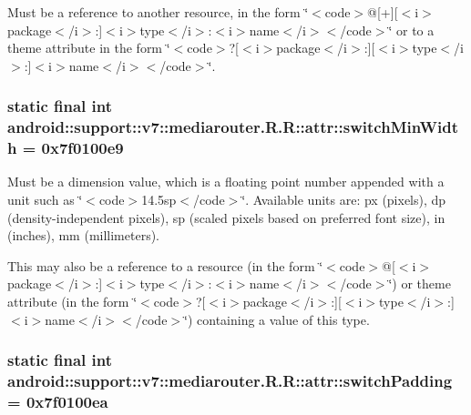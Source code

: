 Must be a reference to another resource, in the form \char`\"{}$<$code$>$@\mbox{[}+\mbox{]}\mbox{[}$<$i$>$package$<$/i$>$:\mbox{]}$<$i$>$type$<$/i$>$:$<$i$>$name$<$/i$>$$<$/code$>$\char`\"{} or to a theme attribute in the form \char`\"{}$<$code$>$?\mbox{[}$<$i$>$package$<$/i$>$:\mbox{]}\mbox{[}$<$i$>$type$<$/i$>$:\mbox{]}$<$i$>$name$<$/i$>$$<$/code$>$\char`\"{}. \hypertarget{classandroid_1_1support_1_1v7_1_1mediarouter_1_1_r_1_1attr_ac6a13f053401d35106724e5b94df1cd}{
\subsubsection[{switchMinWidth}]{\setlength{\rightskip}{0pt plus 5cm}static final int android::support::v7::mediarouter.R.R::attr::switchMinWidth = 0x7f0100e9}}
\label{classandroid_1_1support_1_1v7_1_1mediarouter_1_1_r_1_1attr_ac6a13f053401d35106724e5b94df1cd}


Must be a dimension value, which is a floating point number appended with a unit such as \char`\"{}$<$code$>$14.5sp$<$/code$>$\char`\"{}. Available units are: px (pixels), dp (density-independent pixels), sp (scaled pixels based on preferred font size), in (inches), mm (millimeters). 

This may also be a reference to a resource (in the form \char`\"{}$<$code$>$@\mbox{[}$<$i$>$package$<$/i$>$:\mbox{]}$<$i$>$type$<$/i$>$:$<$i$>$name$<$/i$>$$<$/code$>$\char`\"{}) or theme attribute (in the form \char`\"{}$<$code$>$?\mbox{[}$<$i$>$package$<$/i$>$:\mbox{]}\mbox{[}$<$i$>$type$<$/i$>$:\mbox{]}$<$i$>$name$<$/i$>$$<$/code$>$\char`\"{}) containing a value of this type. \hypertarget{classandroid_1_1support_1_1v7_1_1mediarouter_1_1_r_1_1attr_198a9e3fe43c19c7eaffa220525ec3cd}{
\subsubsection[{switchPadding}]{\setlength{\rightskip}{0pt plus 5cm}static final int android::support::v7::mediarouter.R.R::attr::switchPadding = 0x7f0100ea}}
\label{classandroid_1_1support_1_1v7_1_1mediarouter_1_1_r_1_1attr_198a9e3fe43c19c7eaffa220525ec3cd}


